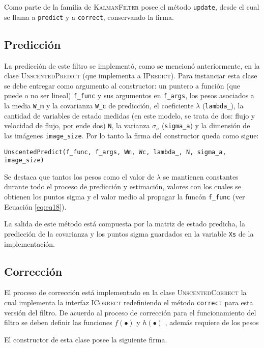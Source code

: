 Como parte de la familia de \textsc{KalmanFilter} posee el m\'etodo \texttt{update}, desde el cual se llama a \texttt{predict} y a \texttt{correct}, conservando la firma.
 
\subsection{Predicci\'on}
La predicci\'on de este filtro se implement\'o, como se mencion\'o anteriormente, en la clase \textsc{UnscentedPredict} (que implementa a \textsc{IPredict}). Para instanciar esta clase se debe entregar como argumento al constructor: un puntero a funci\'on (que puede o no ser lineal) \texttt{f\_func} y sus argumentos en \texttt{f\_args}, los pesos asociados a la media \texttt{W\_m} y la covarianza \texttt{W\_c} de predicci\'on, el coeficiente $\lambda$ (\texttt{lambda\_}), la cantidad de variables de estado medidas (en este modelo, se trata de dos: flujo y velocidad de 
flujo, por ende dos) \texttt{N}, la varianza $\sigma_a$ (\texttt{sigma\_a}) y la dimensi\'on de las im\'agenes \texttt{image\_size}. Por lo tanto la firma del constructor queda como sigue:
\bigskip
\begin{center}
\texttt{UnscentedPredict(f\_func, f\_args, Wm, Wc, lambda\_, N, sigma\_a, image\_size)}
\end{center}
\bigskip

Se destaca que tantos los pesos como el valor de $\lambda$ se mantienen constantes durante todo el proceso de predicci\'on y estimaci\'on, valores con los cuales se obtienen los puntos sigma y el valor medio al propagar la func\'on \texttt{f\_func} (ver Ecuaci\'on \ref{eq:eq18}).
\bigskip

La salida de este m\'etodo est\'a compuesta por la matriz de estado predicha, la predicci\'on de la covarianza y los puntos sigma guardados en la variable \texttt{Xs} de la implementaci\'on.

\subsection{Correcci\'on}
El proceso de correcci\'on est\'a implementado en la clase \textsc{UnscentedCorrect} la cual implementa la interfaz \textsc{ICorrect} redefiniendo el m\'etodo \texttt{correct} para esta versi\'on del filtro. De acuerdo al proceso de correcci\'on para el funcionamiento del filtro se deben definir las funciones $f(•)$ y $h(•)$ , adem\'as requiere de los pesos 

El constructor de esta clase posee la siguiente firma.

